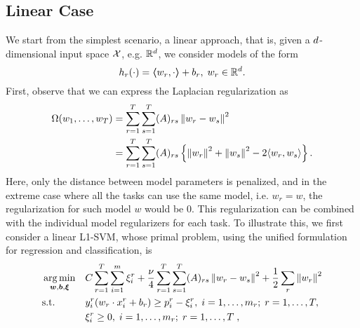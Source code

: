 \subsection{Linear Case}
We start from the simplest scenario, a linear approach, that is, given a $d$-dimensional input space $\mathcal{X}$, e.g. $\mathbb{R}^d$, we consider models of the form
$$ h_r(\cdot) = \bm{\left\langle} w_r, \cdot \bm{\right\rangle} + b_r,\;  w_r \in \mathbb{R}^d .$$
First, observe that we can express the Laplacian regularization as
\begin{equation}
    \nonumber
    \begin{aligned}
        \Omega(w_1, \ldots, w_T) &= \sum_{r=1}^T \sum_{s=1}^T (A)_{rs} \left\lVert w_r - w_s\right\rVert^2 \\
        &=  \sum_{r=1}^T \sum_{s=1}^T (A)_{rs} \left\{ \left\lVert w_r\right\rVert^2 + \left\lVert w_s\right\rVert^2 - 2 \langle w_r, w_s \rangle \right\}.
    \end{aligned}
\end{equation}
Here, only the distance between model parameters is penalized, and in the extreme case where all the tasks can use the same model, i.e. $w_r = w$, the regularization for such model $w$ would be $0$.
This regularization can be combined with the individual model regularizers for each task.
To illustrate this, we first consider a linear L1-SVM, whose primal problem, using the unified formulation for regression and classification, is
\begin{equation}\label{eq:linear_gl_primal}
    \begin{aligned}
         & \argmin_{\fv{w}, \fv{b}, \fv{\xi}}
         &                                    & {C \sum_{r=1}^T \sum_{i=1}^m{\xi_{i}^r} + \frac{\nu}{4} \sum_{r=1}^T \sum_{s=1}^T (A)_{rs} \norm{w_r - w_s}^2 + \frac{1}{2} \sum_r \norm{w_r}^2 }                                                               \\
         & \text{s.t.}
         &                                    & y_{i}^r ( w_r \cdot x_{i}^r + b_r) \geq p_{i}^r - \xi_{i}^r , \;  i=1,\ldots,m_r; \;  r=1,\ldots,T,                                                                                                           \\
         &                                    &                                                                                                                                                 & \xi_{i}^r \geq 0, \;  i=1,\ldots,m_r; \;  r=1,\ldots,T \; ,
    \end{aligned}
\end{equation}
